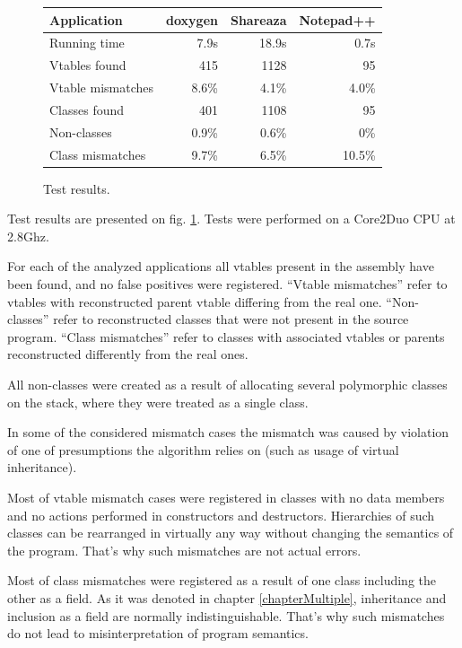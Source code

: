 \documentclass[10pt, conference]{IEEEtran}
\begin{document}
\begin{figure}[htb!]
\begin{tabular}{| l | r | r | r |}
\hline
Application &         doxygen & Shareaza & Notepad++ \\
\hline
Running time &          7.9s  &   18.9s  & 0.7s \\
\hline
Vtables found &         415   &   1128   &  95 \\
\hline
Vtable mismatches &     8.6\% &    4.1\% & 4.0\% \\
\hline
Classes found &         401   &   1108   &  95 \\
\hline
Non-classes &           0.9\% &    0.6\% &   0\% \\
\hline
Class mismatches &      9.7\% &    6.5\% & 10.5\% \\
\hline
\end{tabular}
\caption{Test results.}
\label{fig:tests}
\end{figure}

Test results
are presented on fig. \ref{fig:tests}.
Tests were performed on a Core2Duo CPU at 2.8Ghz.

For each of the analyzed applications all vtables present in
the assembly have been found, and no false positives were registered.
``Vtable mismatches'' refer to vtables with reconstructed parent vtable differing
from the real one.
``Non-classes'' refer to reconstructed classes that were not present
in the source program.
``Class mismatches'' refer to classes with associated vtables or parents
reconstructed differently from the real ones.

All non-classes were created as a result of allocating several polymorphic
classes on the stack, where they were treated as a single class.

In some of the considered
mismatch cases the mismatch was caused by violation of one of presumptions
the algorithm relies on (such as usage of virtual inheritance).

Most of vtable mismatch cases were registered in classes with no data members
and no actions performed in constructors and destructors.
Hierarchies of such classes can be rearranged in virtually any way
without changing the semantics of the program.
That's why such mismatches are not actual errors.

Most of class mismatches were registered as a result of one class
including the other as a field.
As it was denoted in chapter \ref{chapterMultiple}, inheritance and inclusion
as a field are normally indistinguishable. That's why such mismatches
do not lead to misinterpretation of program semantics.
\end{document}
